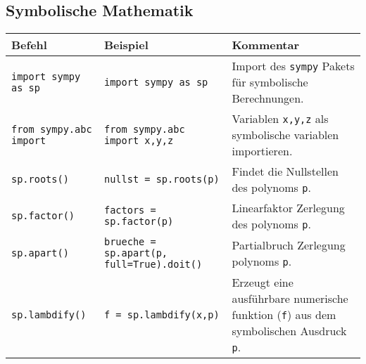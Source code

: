 \subsection*{Symbolische Mathematik}
\begin{table}[H]
    \centering
    \begin{tabular}{|p{3cm}|p{6cm}|p{6cm}|}
        \hline
    \textbf{Befehl} & \textbf{Beispiel} & \textbf{Kommentar} \\ \hline
    
    \texttt{import sympy as sp} & \texttt{import sympy as sp} & Import des \texttt{sympy} Pakets für symbolische Berechnungen. \\ \hline
    \texttt{from sympy.abc import} & \texttt{from sympy.abc import x,y,z} & Variablen \texttt{x,y,z} als symbolische variablen importieren. \\ \hline
    \texttt{sp.roots()} & \texttt{nullst = sp.roots(p)} & Findet die Nullstellen des polynoms \texttt{p}. \\ \hline
    \texttt{sp.factor()} & \texttt{factors = sp.factor(p)} & Linearfaktor Zerlegung des polynoms \texttt{p}. \\ \hline
    \texttt{sp.apart()} & \texttt{brueche = sp.apart(p, full=True).doit()} & Partialbruch Zerlegung polynoms \texttt{p}. \\ \hline
    \texttt{sp.lambdify()} & \texttt{f  = sp.lambdify(x,p)} & Erzeugt eine ausführbare numerische funktion (\texttt{f}) aus dem symbolischen Ausdruck \texttt{p}. \\ \hline

    \end{tabular}
\end{table}
